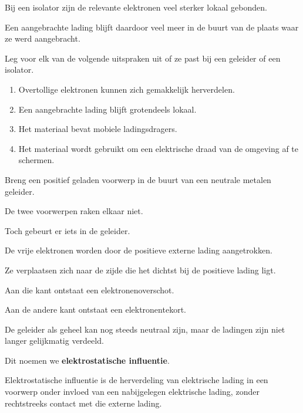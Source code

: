 \documentclass{ximera}
\begin{document}
Bij een isolator zijn de relevante elektronen veel sterker lokaal
gebonden.

Een aangebrachte lading blijft daardoor veel meer in de buurt van de
plaats waar ze werd aangebracht.


\begin{oefening}{\oefB\ESS}

Leg voor elk van de volgende uitspraken uit of ze past bij een
geleider of een isolator.

\begin{enumerate}
  \item Overtollige elektronen kunnen zich gemakkelijk herverdelen.
  \item Een aangebrachte lading blijft grotendeels lokaal.
  \item Het materiaal bevat mobiele ladingsdragers.
  \item Het materiaal wordt gebruikt om een elektrische draad van de
        omgeving af te schermen.
\end{enumerate}

\end{oefening}




Breng een positief geladen voorwerp in de buurt van een neutrale
metalen geleider.

De twee voorwerpen raken elkaar niet.

Toch gebeurt er iets in de geleider.

De vrije elektronen worden door de positieve externe lading
aangetrokken.

Ze verplaatsen zich naar de zijde die het dichtst bij de positieve
lading ligt.

Aan die kant ontstaat een elektronenoverschot.

Aan de andere kant ontstaat een elektronentekort.

De geleider als geheel kan nog steeds neutraal zijn, maar de ladingen
zijn niet langer gelijkmatig verdeeld.

Dit noemen we \textbf{elektrostatische influentie}.


\begin{definitie}

Elektrostatische influentie is de herverdeling van elektrische lading
in een voorwerp onder invloed van een nabijgelegen elektrische lading,
zonder rechtstreeks contact met die externe lading.

\end{definitie}
\end{document}
